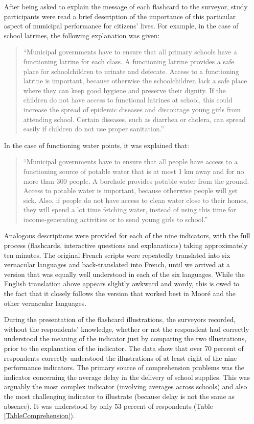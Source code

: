 \documentclass[11pt]{article}
\begin{document}
After being asked to explain the message of each flashcard to the surveyor, study participants were read a brief description of the importance of this particular aspect of municipal performance for citizens' lives. For example, in the case of school latrines, the following explanation was given: 
\begin{quote}
``Municipal governments have to ensure that all primary schools have a functioning latrine for each class. A functioning latrine provides a safe place for schoolchildren to urinate and defecate. Access to a functioning latrine is important, because otherwise the schoolchildren lack a safe place where they can keep good hygiene and preserve their dignity. If the children do not have access to functional latrines at school, this could increase the spread of epidemic diseases and discourage young girls from attending school. Certain diseases, such as diarrhea or cholera, can spread easily if children do not use proper sanitation.''
\end{quote}
In the case of functioning water points, it was explained that: 
\begin{quote}
``Municipal governments have to ensure that all people have access to a functioning source of potable water that is at most 1 km away and for no more than 300 people.  A borehole provides potable water from the ground. Access to potable water is important, because otherwise people will get sick. Also, if people do not have access to clean water close to their homes, they will spend a lot time fetching water, instead of using this time for income-generating activities or to send young girls to school.''
\end{quote} 
Analogous descriptions were provided for each of the nine indicators, with the full process (flashcards, interactive questions and explanations) taking approximately ten minutes. The original French scripts were repeatedly translated into six vernacular languages and back-translated into French, until we arrived at a version that was equally well understood in each of the six languages. While the English translation above appears slightly awkward and wordy, this is owed to the fact that it closely follows the version that worked best in Moor\'{e} and the other vernacular languages. 

During the presentation of the flashcard illustrations, the surveyors recorded, without the respondents' knowledge, whether or not the respondent had correctly understood the meaning of the indicator just by comparing the two illustrations, prior to the explanation of the indicator. The data show that over 70 percent of respondents correctly understood the illustrations of at least eight of the nine performance indicators. The primary source of comprehension problems was the indicator concerning the average delay in the delivery of school supplies. This was arguably the most complex indicator (involving averages across schools) and also the most challenging indicator to illustrate (because delay is not the same as absence). It was understood by only 53 percent of respondents (Table \ref{TableComprehension}). 
\end{document}
